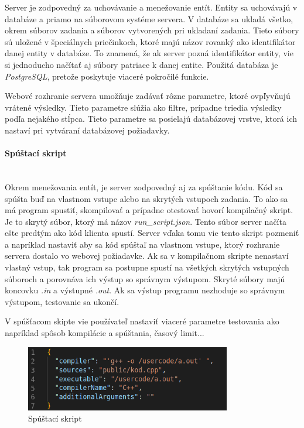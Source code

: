 Server je zodpovedný za uchovávanie a menežovanie entít. Entity sa uchovávajú v
databáze a priamo na súborovom systéme servera. V databáze sa ukladá všetko, okrem súborov
zadania a súborov vytvorených pri ukladaní zadania. Tieto súbory sú uložené v špeciálnych
priečinkoch, ktoré majú názov rovanký ako identifikátor danej entity v databáze. To znamená, že
ak server pozná identifikátor entity, vie si jednoducho načítať aj súbory patriace k danej entite.
Použitá databáza je \textit{PostgreSQL}, pretože poskytuje viaceré pokročilé funkcie.

Webové rozhranie servera umožňuje zadávať rôzne parametre, ktoré ovpľyvňujú vrátené výsledky. Tieto
parametre slúžia ako filtre, prípadne triedia výsledky podľa nejakého stĺpca. Tieto parametre sa
posielajú databázovej vrstve, ktorá ich nastaví pri vytváraní databázovej požiadavky.

\paragraph{Spúštací skript}\leavevmode\\
Okrem menežovania entít, je server zodpovedný aj za spúštanie kódu. Kód sa spúšta buď na vlastnom
vstupe alebo na skrytých vstupoch zadania. To ako sa má program spustiť, skompilovať a prípadne
otestovať hovorí kompilačný skript. Je to skrytý súbor, ktorý má názov
\textit{run\_script.json}. Tento súbor server načíta ešte predtým ako kód klienta spustí. Server
vďaka tomu vie tento skript pozmeniť a napríklad nastaviť aby sa kód spúštaľ na vlastnom vstupe,
ktorý rozhranie servera dostalo vo webovej požiadavke. Ak sa v kompilačnom skripte nenastaví
vlastný vstup, tak program sa postupne spustí na všetkých skrytých vstupných súboroch a porovnáva
ich výstup so správnym výstupom. Skryté súbory majú koncovku \textit{.in} a výstupné \textit{.out}.
Ak sa výstup programu nezhoduje so správnym výstupom, testovanie sa ukončí.

V spúšťacom skipte vie používateľ nastaviť viaceré parametre testovania ako napríklad spôsob
kompilácie a spúštania, časový limit...
\begin{figure}[H]
\centerline{\includegraphics[width=0.8\textwidth]{images/spustaci_skript}}
\caption[Spúštací skript]{Spúštací skript}
\label{obr:zadania}
\end{figure}

